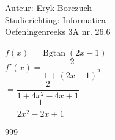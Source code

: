 \documentclass[a4paper]{article}
\begin{document}
  
\noindent \large Auteur: Eryk Borczuch \\
\noindent \large Studierichting: Informatica\\
\noindent \large Oefeningenreeks 3A nr. 26.6\\

\medskip

\normalsize
\newcommand{\Bgtan}{\operatorname{Bgtan}}

$f(x) = \Bgtan(2x-1)$\\

$f'(x) = \dfrac{2}{1+(2x-1)^2}$\\

$= \dfrac{2}{1+4x^2-4x+1}$\\

$ = \dfrac{1}{2x^2 -2x+1}$

\begin{thebibliography}{999}
\end{thebibliography}
\end{document}
